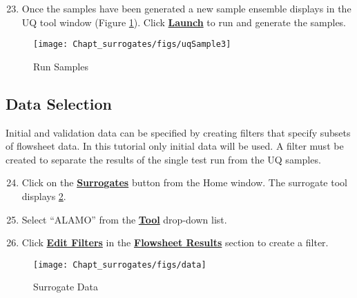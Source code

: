 \begin{enumerate}
\setcounter{enumi}{22}
\item Once the samples have been generated a new sample ensemble displays in the UQ tool window (Figure \ref{fig.tut.sur.new.uq.sample3}).  Click \textbf{\underline{Launch}} to run and generate the samples.
\end{enumerate}
\begin{figure}[H]
	\begin{center}
		\texttt{[image: Chapt\_surrogates/figs/uqSample3]}
		\caption{Run Samples}
		\label{fig.tut.sur.new.uq.sample3}
	\end{center}
\end{figure}

\subsection{Data Selection}

Initial and validation data can be specified by creating filters that specify subsets of flowsheet data. In this tutorial only initial data will be used. A filter must be created to separate the results of the single test run from the UQ samples.

\begin{enumerate}
	\setcounter{enumi}{23}
	\item Click on the \textbf{\underline{Surrogates}} button from the Home window. The surrogate tool displays \ref{fig.tut.sur.data}.
	\item Select ``ALAMO'' from the \textbf{\underline{Tool}} drop-down list.
	\item Click \textbf{\underline{Edit Filters}} in the \textbf{\underline{Flowsheet Results}} section to create a filter.
\end{enumerate} 
\begin{figure}[H]
	\begin{center}
		\texttt{[image: Chapt\_surrogates/figs/data]}
		\caption{Surrogate Data}
		\label{fig.tut.sur.data}
	\end{center}
\end{figure}

